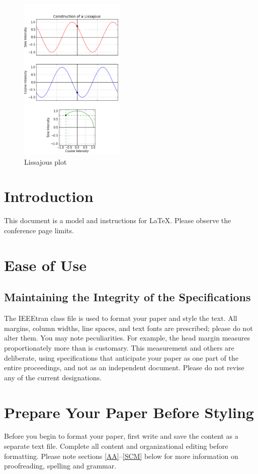 \documentclass[conference]{IEEEtran}
\begin{document}
\begin{figure}[htbp]
    \centerline{\includegraphics[width = 0.45\textwidth]{../img/Lissajous1.png}}
    \caption{Lissajous plot}
\end{figure}

\section{Introduction}
This document is a model and instructions for \LaTeX.
Please observe the conference page limits. 

\section{Ease of Use}

\subsection{Maintaining the Integrity of the Specifications}

The IEEEtran class file is used to format your paper and style the text. All margins, 
column widths, line spaces, and text fonts are prescribed; please do not 
alter them. You may note peculiarities. For example, the head margin
measures proportionately more than is customary. This measurement 
and others are deliberate, using specifications that anticipate your paper 
as one part of the entire proceedings, and not as an independent document. 
Please do not revise any of the current designations.

\section{Prepare Your Paper Before Styling}
Before you begin to format your paper, first write and save the content as a 
separate text file. Complete all content and organizational editing before 
formatting. Please note sections \ref{AA}--\ref{SCM} below for more information on 
proofreading, spelling and grammar.
\end{document}
